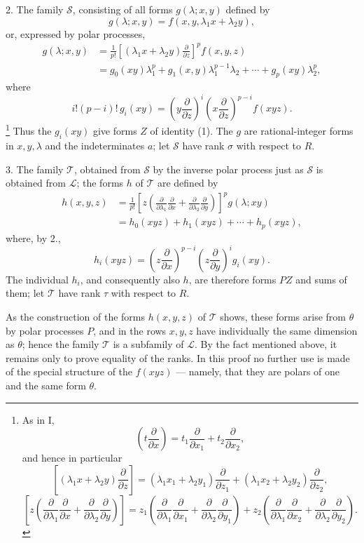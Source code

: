 \documentclass[11pt]{article}
\begin{document}
2. The family $\mathcal S$, consisting of all forms $g(\lambda;x,y)$ defined by
\[
  g(\lambda;x,y)=f(x,y,\lambda_1x+\lambda_2y),
\]
or, expressed by polar processes,
\[
\begin{aligned}
  g(\lambda;x,y)
  &=\frac1{p!}\left[(\lambda_1x+\lambda_2y)\frac{\partial}{\partial z}\right]^p f(x,y,z) \\
  &=g_0(xy)\lambda_1^p+g_1(x,y)\lambda_1^{p-1}\lambda_2+\cdots+g_p(xy)\lambda_2^p,
\end{aligned}
\]
where
\[
  i!(p-i)!\,g_i(xy)=
  \left(y\frac{\partial}{\partial z}\right)^i
  \left(x\frac{\partial}{\partial z}\right)^{p-i}f(xyz).
\]
\footnote{As in I,
\[
 \left(t\frac{\partial}{\partial x}\right)=t_1\frac{\partial}{\partial x_1}+t_2\frac{\partial}{\partial x_2},
\]
and hence in particular
\[
 \left[(\lambda_1x+\lambda_2y)\frac{\partial}{\partial z}\right]
 = (\lambda_1x_1+\lambda_2y_1)\frac{\partial}{\partial z_1}
 + (\lambda_1x_2+\lambda_2y_2)\frac{\partial}{\partial z_2},
\]
\[
 \left[z\left(\frac{\partial}{\partial\lambda_1}\frac{\partial}{\partial x}
 +\frac{\partial}{\partial\lambda_2}\frac{\partial}{\partial y}\right)\right]
 =z_1\left(\frac{\partial}{\partial\lambda_1}\frac{\partial}{\partial x_1}
 +\frac{\partial}{\partial\lambda_2}\frac{\partial}{\partial y_1}\right)
 +z_2\left(\frac{\partial}{\partial\lambda_1}\frac{\partial}{\partial x_2}
 +\frac{\partial}{\partial\lambda_2}\frac{\partial}{\partial y_2}\right).
\]}
Thus the $g_i(xy)$ give forms $Z$ of identity (1). The $g$ are rational-integer forms in $x,y,\lambda$ and the indeterminates $a$; let $\mathcal S$ have rank $\sigma$ with respect to $R$.

3. The family $\mathcal T$, obtained from $\mathcal S$ by the inverse polar process just as $\mathcal S$ is obtained from $\mathcal L$; the forms $h$ of $\mathcal T$ are defined by
\[
\begin{aligned}
 h(x,y,z)
 &=\frac1{p!}\left[z\left(\frac{\partial}{\partial\lambda_1}\frac{\partial}{\partial x}
 +\frac{\partial}{\partial\lambda_2}\frac{\partial}{\partial y}\right)\right]^p g(\lambda;xy)\\
 &=h_0(xyz)+h_1(xyz)+\cdots+h_p(xyz),
\end{aligned}
\]
where, by 2.,
\[
  h_i(xyz)=
  \left(z\frac{\partial}{\partial x}\right)^{p-i}
  \left(z\frac{\partial}{\partial y}\right)^i g_i(xy).
\]
The individual $h_i$, and consequently also $h$, are therefore forms $PZ$ and sums of them; let $\mathcal T$ have rank $\tau$ with respect to $R$.

As the construction of the forms $h(x,y,z)$ of $\mathcal T$ shows, these forms arise from $\theta$ by polar processes $P$, and in the rows $x,y,z$ have individually the same dimension as $\theta$; hence the family $\mathcal T$ is a subfamily of $\mathcal L$. By the fact mentioned above, it remains only to prove equality of the ranks. In this proof no further use is made of the special structure of the $f(xyz)$ --- namely, that they are polars of one and the same form $\theta$.
\end{document}

